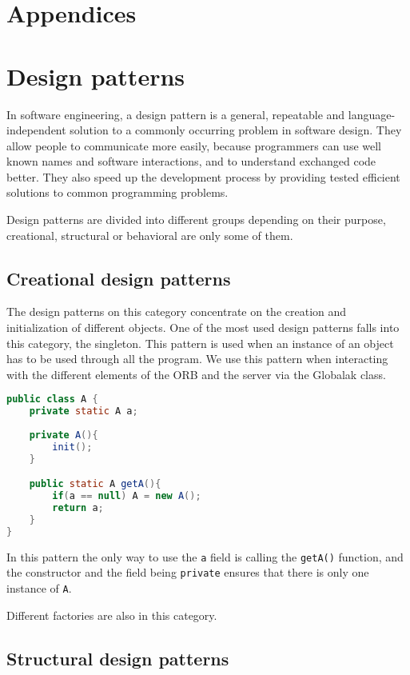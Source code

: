 \section*{Appendices}

\section{Design patterns}
In software engineering, a design pattern is a general, repeatable and language-independent solution to a commonly occurring problem in software design. They allow people to communicate more easily, because programmers can use well known names and software interactions, and to understand exchanged code better. They also speed up the development process by providing tested efficient solutions to common programming problems.

Design patterns are divided into different groups depending on their purpose, creational, structural or behavioral are only some of them.

\subsection*{Creational design patterns}

The design patterns on this category concentrate on the creation and initialization of different objects.
One of the most used design patterns falls into this category, the singleton. This pattern is used when an instance of an object has to be used through all the program. We use this pattern when interacting with the different elements of the ORB and the server via the Globalak class.
\begin{lstlisting}[language=java]
public class A {
    private static A a;
   
    private A(){
        init();
    }

    public static A getA(){
        if(a == null) A = new A();
        return a;
    }
}
\end{lstlisting}
In this pattern the only way to use the \lstinline{a} field is calling the  \lstinline{getA()} function, and the constructor and the field being \lstinline{private} ensures that there is only one instance of \lstinline{A}.

Different factories are also in this category.


\subsection*{Structural design patterns}

